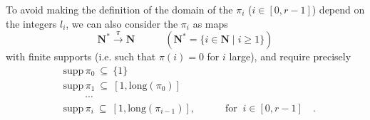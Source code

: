 \documentclass[11pt]{article}
\newcommand{\msp}[1]{\marginpar{\footnotesize [#1]}}
\begin{document}
\msp{page 57}
To avoid making the definition of the domain of the $\pi_i$ ($i\in[0,r-1]$) depend on the integers $l_i$, we can also consider the $\pi_i$ as maps
\[
\mathbf{N}^*\xrightarrow{\ \pi\ }\mathbf{N} \qquad\quad (\mathbf{N}^*=\{i\in\mathbf{N}\mid i\geq 1\})
\]
with finite supports (i.e. such that $\pi(i)=0$ for $i$ large), and require precisely
\[
\begin{aligned}
&\mathrm{supp}\,\pi_0\ \subseteq\ \{1\}\\
&\mathrm{supp}\,\pi_1\ \subseteq\ [1,\mathrm{long}(\pi_0)]\\
&\qquad\ \cdots\\
&\boxed{\mathrm{supp}\,\pi_i\ \subseteq\ [1,\mathrm{long}(\pi_{i-1})]}, \qquad\quad \text{for }\ \boxed{i\in[0,r-1]}\quad .
\end{aligned}
\tag*{$(**)$}
\]
\end{document}
